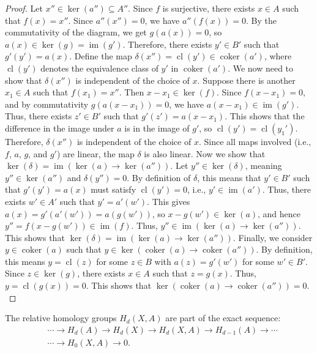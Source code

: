 \begin{proof}
Let \( x'' \in \ker(a'') \subseteq A'' \). Since \( f \) is surjective, there exists \( x \in A \) such that \( f(x) = x'' \). Since \( a''(x'') = 0 \), we have $a''(f(x)) = 0$. By the commutativity of the diagram, we get $g(a(x)) = 0$, so \( a(x) \in \ker(g) = \operatorname{im}(g') \). Therefore, there exists \( y' \in B' \) such that \( g'(y') = a(x) \). Define the map \( \delta(x'') = \operatorname{cl}(y') \in \operatorname{coker}(a') \), where \( \operatorname{cl}(y') \) denotes the equivalence class of \( y' \) in \( \operatorname{coker}(a') \). We now need to show that \( \delta(x'') \) is independent of the choice of \( x \). Suppose there is another \( x_1 \in A \) such that \( f(x_1) = x'' \). Then $x - x_1 \in \ker(f)$. Since \( f(x - x_1) = 0 \), and by commutativity \( g(a(x - x_1)) = 0 \), we have \( a(x - x_1) \in \operatorname{im}(g') \). Thus, there exists \( z' \in B' \) such that \( g'(z') = a(x - x_1) \). This shows that the difference in the image under \( a \) is in the image of \( g' \), so \( \operatorname{cl}(y') = \operatorname{cl}(y_1') \). Therefore, \( \delta(x'') \) is independent of the choice of \( x \). Since all maps involved (i.e., \( f \), \( a \), \( g \), and \( g' \)) are linear, the map \( \delta \) is also linear. Now we show that \( \ker(\delta) = \operatorname{im}(\ker(a) \to \ker(a'')). \) Let \( y'' \in \ker(\delta) \), meaning \( y'' \in \ker(a'') \) and \( \delta(y'') = 0 \). By definition of \( \delta \), this means that \( y' \in B' \) such that \( g'(y') = a(x) \) must satisfy \( \operatorname{cl}(y') = 0 \), i.e., \( y' \in \operatorname{im}(a') \). Thus, there exists \( w' \in A' \) such that \( y' = a'(w') \). This gives $a(x) = g'(a'(w')) = a(g(w'))$, so \( x - g(w') \in \ker(a) \), and hence $y'' = f(x - g(w')) \in \operatorname{im}(f)$. Thus, \( y'' \in \operatorname{im}(\ker(a) \to \ker(a'')). \) This shows that \( \ker(\delta) = \operatorname{im}(\ker(a) \to \ker(a'')). \) Finally, we consider \( y \in \operatorname{coker}(a) \) such that \( y \in \ker(\operatorname{coker}(a) \to \operatorname{coker}(a'')). \) By definition, this means \( y = \operatorname{cl}(z) \) for some \( z \in B \) with \( a(z) = g'(w') \) for some \( w' \in B' \). Since \( z \in \ker(g) \), there exists \( x \in A \) such that \( z = g(x) \). Thus, $y = \operatorname{cl}(g(x)) = 0$. This shows that \( \ker(\operatorname{coker}(a) \to \operatorname{coker}(a'')) = 0. \)
\end{proof}

\begin{theorem}{\cite[p. 115 f.]{hatcher2005algebraic}}
	The relative homology groups \( H_{d}(X, A) \) are part of the exact sequence:
	\begin{align}
		  & \cdots \rightarrow H_{d}(A) \rightarrow H_{d}(X) \rightarrow H_{d}(X, A) \rightarrow H_{d-1}(A) \rightarrow \cdots \nonumber\\
		  & \cdots \rightarrow H_{0}(X, A) \rightarrow 0.                                                                      
	\end{align}
\end{theorem}


